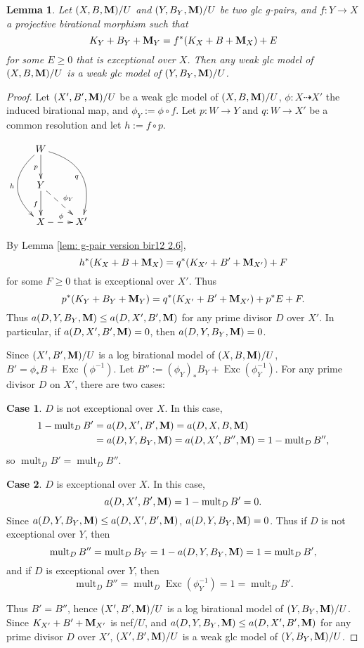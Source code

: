 \documentclass[11pt]{amsart}
\numberwithin{equation}{section}
\newcommand{\Mm}{{\bf{M}}}
\newcommand{\Exc}{\operatorname{Exc}}
\newcommand{\mult}{\operatorname{mult}}
\newtheorem{lem}[thm]{Lemma}
\theoremstyle{definition}
\theoremstyle{definition}
\theoremstyle{definition}
\begin{document}
\begin{lem}\label{lem: same weak glc model under pullback}
Let $(X,B,\Mm)/U$ and $(Y,B_Y,\Mm)/U$ be two glc g-pairs, and $f: Y\rightarrow X$ a projective birational morphism such that
$$K_Y+B_Y+\Mm_Y=f^*(K_X+B+\Mm_X)+E$$
for some $E\geq 0$ that is exceptional over $X$. Then any weak glc model of $(X,B,\Mm)/U$ is a weak glc model of $(Y,B_Y,\Mm)/U$.
\end{lem}
\begin{proof}
Let $(X',B',\Mm)/U$ be a weak glc model of $(X,B,\Mm)/U$, $\phi: X\dashrightarrow X'$ the induced birational map, and $\phi_Y:=\phi\circ f$. Let $p: W\rightarrow Y$ and $q: W\rightarrow X'$ be a common resolution and let $h:=f\circ p$. 
\begin{center}$\xymatrix{
W\ar@{->}[d]_{p}\ar@/^2pc/[ddr]_q\ar@/_2pc/[dd]_h  \\
Y\ar@{->}[d]_{f}\ar@{-->}[dr]^{\phi_Y}&    \\
 X\ar@{-->}[r]^{\phi}& X'
}$
\end{center}
By Lemma \ref{lem: g-pair version bir12 2.6},
$$h^*(K_X+B+\Mm_X)=q^*(K_{X'}+B'+\Mm_{X'})+F$$
for some $F\geq 0$ that is exceptional over $X'$. Thus 
$$p^*(K_Y+B_Y+\Mm_Y)=q^*(K_{X'}+B'+\Mm_{X'})+p^*E+F.$$
Thus $a(D,Y,B_Y,\Mm)\leq a(D,X',B',\Mm)$ for any prime divisor $D$ over $X'$. In particular, if $a(D,X',B',\Mm)=0$, then $a(D,Y,B_Y,\Mm)=0$.

Since $(X',B',\Mm)/U$ is a log birational model of $(X,B,\Mm)/U$, $B'=\phi_*B+\Exc(\phi^{-1})$. Let $B'':=(\phi_Y)_*B_Y+\Exc(\phi_Y^{-1})$. For any prime divisor $D$ on $X'$, there are two cases:

\medskip

\noindent\textbf{Case 1}. $D$ is not exceptional over $X$. In this case,
\begin{align*}
   1-\mult_DB'&=a(D,X',B',\Mm)=a(D,X,B,\Mm)\\
   &=a(D,Y,B_Y,\Mm)=a(D,X',B'',\Mm)=1-\mult_DB'',
\end{align*}
so $\mult_DB'=\mult_DB''$.

\medskip

\noindent\textbf{Case 2}. $D$ is exceptional over $X$. In this case, 
$$a(D,X',B',\Mm)=1-\mult_DB'=0.$$
Since $a(D,Y,B_Y,\Mm)\leq a(D,X',B',\Mm)$, $a(D,Y,B_Y,\Mm)=0$. Thus if $D$ is not exceptional over $Y$, then
$$\mult_DB''=\mult_DB_Y=1-a(D,Y,B_Y,\Mm)=1=\mult_DB',$$
and if $D$ is exceptional over $Y$, then
$$\mult_DB''=\mult_D\Exc(\phi_Y^{-1})=1=\mult_DB'.$$

Thus $B'=B''$, hence $(X',B',\Mm)/U$ is a log birational model of $(Y,B_Y,\Mm)/U$. Since $K_{X'}+B'+\Mm_{X'}$ is nef$/U$, and
$a(D,Y,B_Y,\Mm)\leq a(D,X',B',\Mm)$ for any prime divisor $D$ over $X'$, $(X',B',\Mm)/U$ is a weak glc model of $(Y,B_Y,\Mm)/U$.
\end{proof}
\end{document}
